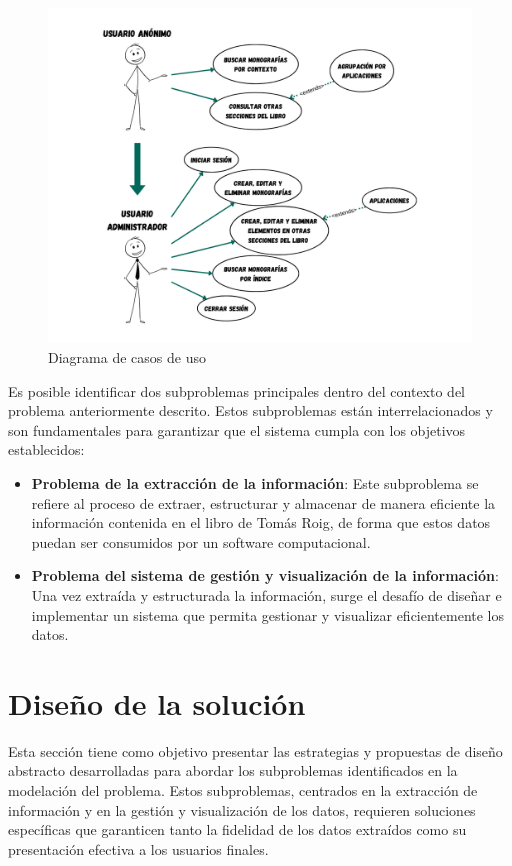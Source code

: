 \begin{figure}[ht!]
    \centering
    \includegraphics[width=1\textwidth]{Images/use-cases.png}
    \caption{Diagrama de casos de uso}
    \label{fig:use-cases}
\end{figure}

Es posible identificar dos subproblemas principales dentro del contexto del problema anteriormente descrito. 
Estos subproblemas están interrelacionados y son fundamentales para garantizar que el sistema cumpla 
con los objetivos establecidos:

\begin{itemize}
    \item \textbf{Problema de la extracción de la información}: Este subproblema se refiere al proceso 
    de extraer, estructurar y almacenar de manera eficiente la información contenida en el libro de Tomás Roig, 
    de forma que estos datos puedan ser consumidos por un software computacional.
    \item \textbf{Problema del sistema de gestión y visualización de la información}: Una vez 
    extraída y estructurada la información, surge el desafío de diseñar e implementar un sistema que permita 
    gestionar y visualizar eficientemente los datos.
\end{itemize}




\newpage 
\section{Diseño de la solución}
Esta sección tiene como objetivo presentar las estrategias y propuestas de diseño abstracto desarrolladas 
para abordar los subproblemas identificados en la modelación del problema. 
Estos subproblemas, centrados en la extracción de información y en la gestión y 
visualización de los datos, requieren soluciones específicas que garanticen tanto 
la fidelidad de los datos extraídos como su presentación efectiva a los usuarios finales.

